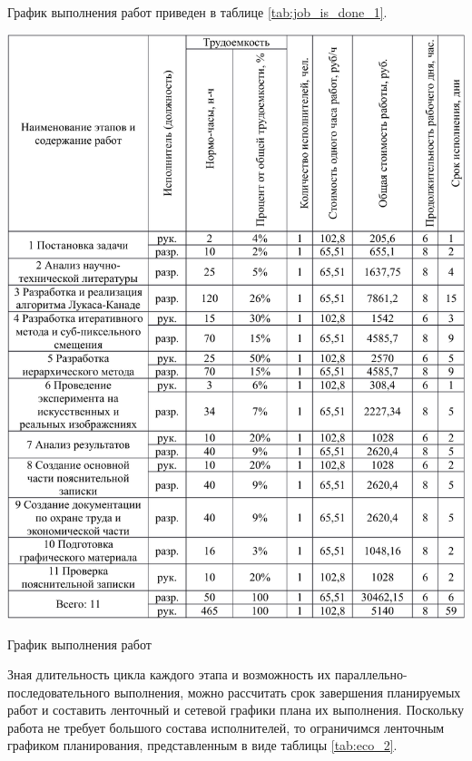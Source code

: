 График выполнения работ приведен в таблице \ref{tab:job_is_done_1}.

\begin{table}[h!]
\centering
\includegraphics[page=1, width=0.9\linewidth]{econom_table.pdf}
\caption{График выполнения работ}
\label{tab:job_is_done_1}
\end{table}


Зная длительность цикла каждого этапа и возможность их параллельно-последовательного выполнения, можно рассчитать срок завершения планируемых работ и составить ленточный и сетевой графики плана их выполнения. Поскольку работа не требует большого состава исполнителей, то ограничимся ленточным графиком планирования, представленным в виде таблицы \ref{tab:eco_2}.

